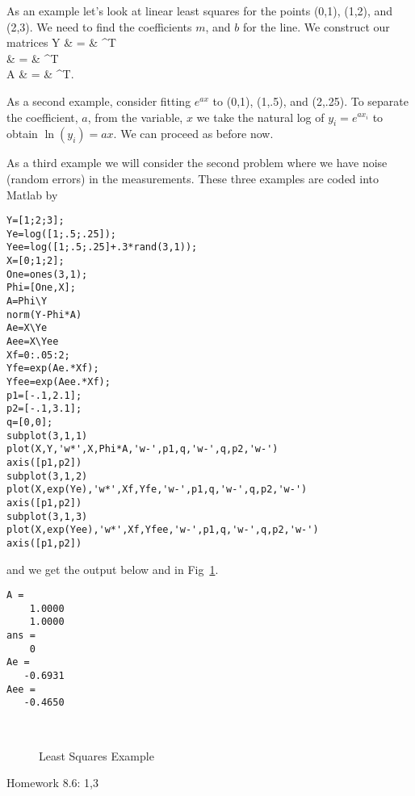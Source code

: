 As an example let's look at linear least squares for the points 
(0,1), (1,2), and (2,3).  We need to find the coefficients $m$, and $b$ 
for the line.  We construct our matrices
\beqn
Y & = & ^{T} \\
\Phi & = & ^{T} \\
A & = & ^{T}.
\eeqn

As a second example, consider fitting $e^{ax}$ to (0,1), (1,.5), and 
(2,.25).  To separate the coefficient, $a$, from the variable, $x$ we 
take the natural log of $y_{i}=e^{ax_{i}}$ to obtain $\ln(y_{i})=ax$.  
We can proceed as before now.

As a third example we will consider the second problem where we have 
noise (random errors) in the measurements.  These three examples are 
coded into Matlab by
\begin{list}{}{\leftmargin=3em}\item[]
\begin{verbatim}
Y=[1;2;3];
Ye=log([1;.5;.25]);
Yee=log([1;.5;.25]+.3*rand(3,1));
X=[0;1;2];
One=ones(3,1);
Phi=[One,X];
A=Phi\Y
norm(Y-Phi*A)
Ae=X\Ye
Aee=X\Yee
Xf=0:.05:2;
Yfe=exp(Ae.*Xf);
Yfee=exp(Aee.*Xf);
p1=[-.1,2.1];
p2=[-.1,3.1];
q=[0,0];
subplot(3,1,1)
plot(X,Y,'w*',X,Phi*A,'w-',p1,q,'w-',q,p2,'w-')
axis([p1,p2])
subplot(3,1,2)
plot(X,exp(Ye),'w*',Xf,Yfe,'w-',p1,q,'w-',q,p2,'w-')
axis([p1,p2])
subplot(3,1,3)
plot(X,exp(Yee),'w*',Xf,Yfee,'w-',p1,q,'w-',q,p2,'w-')
axis([p1,p2])
\end{verbatim}
\end{list}
and we get the output below and in Fig~\ref{llsqex}.
\begin{list}{}{\leftmargin=3em}\item[]
\begin{verbatim}
A =
    1.0000
    1.0000
ans =
    0
Ae =
   -0.6931
Aee =
   -0.4650
\end{verbatim}
\end{list}

\begin{figure}[h]
\begin{center}
\leavevmode
\hbox{
\epsfxsize=4in
}
\end{center}
\caption{Least Squares Example}
\label{llsqex}
\end{figure}

Homework 8.6: 1,3
